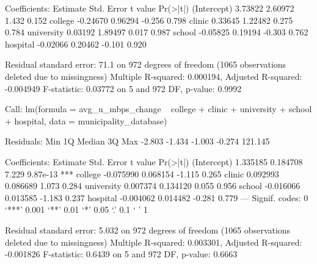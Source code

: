 \documentclass{article}
\begin{document}
Coefficients:
            Estimate Std. Error t value Pr(>|t|)
(Intercept)  3.73822    2.60972   1.432    0.152
college     -0.24670    0.96294  -0.256    0.798
clinic       0.33645    1.22482   0.275    0.784
university   0.03192    1.89497   0.017    0.987
school      -0.05825    0.19194  -0.303    0.762
hospital    -0.02066    0.20462  -0.101    0.920

Residual standard error: 71.1 on 972 degrees of freedom
  (1065 observations deleted due to missingness)
Multiple R-squared:  0.000194,	Adjusted R-squared:  -0.004949 
F-statistic: 0.03772 on 5 and 972 DF,  p-value: 0.9992

\newpage

Call:
lm(formula = avg\_u\_mbps\_change ~ college + clinic + university + 
    school + hospital, data = municipality\_database)

Residuals:
    Min      1Q  Median      3Q     Max 
 -2.803  -1.434  -1.003  -0.274 121.145 

Coefficients:
             Estimate Std. Error t value Pr(>|t|)    
(Intercept)  1.335185   0.184708   7.229 9.87e-13 ***
college     -0.075990   0.068154  -1.115    0.265    
clinic       0.092993   0.086689   1.073    0.284    
university   0.007374   0.134120   0.055    0.956    
school      -0.016066   0.013585  -1.183    0.237    
hospital    -0.004062   0.014482  -0.281    0.779    
---
Signif. codes:  0 ‘***’ 0.001 ‘**’ 0.01 ‘*’ 0.05 ‘.’ 0.1 ‘ ’ 1

Residual standard error: 5.032 on 972 degrees of freedom
  (1065 observations deleted due to missingness)
Multiple R-squared:  0.003301,	Adjusted R-squared:  -0.001826 
F-statistic: 0.6439 on 5 and 972 DF,  p-value: 0.6663
\end{document}
